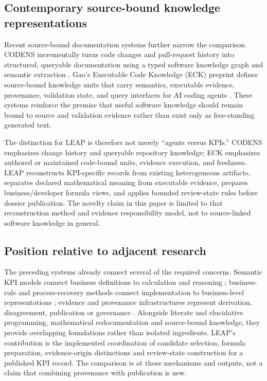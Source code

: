 \documentclass[a4paper,fleqn]{cas-dc}
\begin{document}
\subsection{Contemporary source-bound knowledge representations}

Recent source-bound documentation systems further narrow the comparison. CODENS incrementally turns code changes and pull-request history into structured, queryable documentation using a typed software knowledge graph and semantic extraction \citep{Kelious2026}. Gao's Executable Code Knowledge (ECK) preprint defines source-bound knowledge units that carry semantics, executable evidence, provenance, validation state, and query interfaces for AI coding agents \citep{Gao2026}. These systems reinforce the premise that useful software knowledge should remain bound to source and validation evidence rather than exist only as free-standing generated text.

The distinction for LEAP is therefore not merely ``agents versus KPIs.'' CODENS emphasizes change history and queryable repository knowledge; ECK emphasizes authored or maintained code-bound units, evidence execution, and freshness. LEAP reconstructs KPI-specific records from existing heterogeneous artifacts, separates declared mathematical meaning from executable evidence, prepares business/developer formula views, and applies bounded review-state rules before dossier publication. The novelty claim in this paper is limited to that reconstruction method and evidence responsibility model, not to source-linked software knowledge in general.

\subsection{Position relative to adjacent research}

The preceding systems already connect several of the required concerns. Semantic KPI models connect business definitions to calculation and reasoning \citep{Mate2017,RoldanGarcia2021}; business-rule and process-recovery methods connect implementation to business-level representations \citep{PutryczKark2008,PerezCastillo2011MARBLE,Chittimalli2019SBVR}; evidence and provenance infrastructures represent derivation, disagreement, publication or governance \citep{Brush2016SEPIO,Psallidas2023OneProvenance,Sadiq2026ESDPKI}. Alongside literate and elucidative programming, mathematical redocumentation and source-bound knowledge, they provide overlapping foundations rather than isolated ingredients. LEAP's contribution is the implemented coordination of candidate selection, formula preparation, evidence-origin distinctions and review-state construction for a published KPI record. The comparison is at those mechanisms and outputs, not a claim that combining provenance with publication is new.
\end{document}
